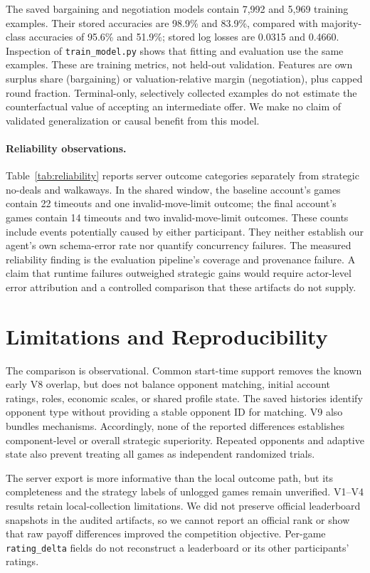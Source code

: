 \documentclass{article}
\begin{document}
The saved bargaining and negotiation models contain 7,992 and 5,969 training examples. Their stored accuracies are 98.9\% and 83.9\%, compared with majority-class accuracies of 95.6\% and 51.9\%; stored log losses are 0.0315 and 0.4660. Inspection of \texttt{train\_model.py} shows that fitting and evaluation use the same examples. These are training metrics, not held-out validation. Features are own surplus share (bargaining) or valuation-relative margin (negotiation), plus capped round fraction. Terminal-only, selectively collected examples do not estimate the counterfactual value of accepting an intermediate offer. We make no claim of validated generalization or causal benefit from this model.

\paragraph{Reliability observations.}
Table~\ref{tab:reliability} reports server outcome categories separately from strategic no-deals and walkaways. In the shared window, the baseline account's games contain 22 timeouts and one invalid-move-limit outcome; the final account's games contain 14 timeouts and two invalid-move-limit outcomes. These counts include events potentially caused by either participant. They neither establish our agent's own schema-error rate nor quantify concurrency failures. The measured reliability finding is the evaluation pipeline's coverage and provenance failure. A claim that runtime failures outweighed strategic gains would require actor-level error attribution and a controlled comparison that these artifacts do not supply.

\section{Limitations and Reproducibility}

The comparison is observational. Common start-time support removes the known early V8 overlap, but does not balance opponent matching, initial account ratings, roles, economic scales, or shared profile state. The saved histories identify opponent type without providing a stable opponent ID for matching. V9 also bundles mechanisms. Accordingly, none of the reported differences establishes component-level or overall strategic superiority. Repeated opponents and adaptive state also prevent treating all games as independent randomized trials.

The server export is more informative than the local outcome path, but its completeness and the strategy labels of unlogged games remain unverified. V1--V4 results retain local-collection limitations. We did not preserve official leaderboard snapshots in the audited artifacts, so we cannot report an official rank or show that raw payoff differences improved the competition objective. Per-game \texttt{rating\_delta} fields do not reconstruct a leaderboard or its other participants' ratings.
\end{document}
